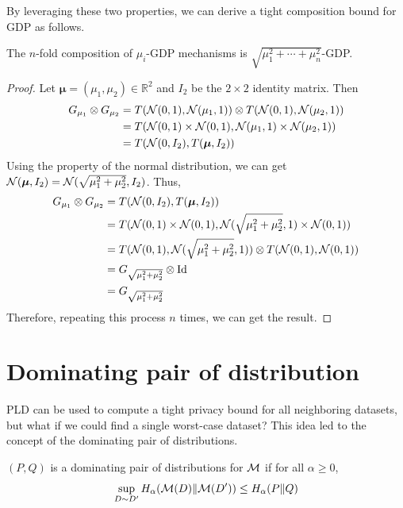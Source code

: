\documentclass{article}
\begin{document}
By leveraging these two properties, we can derive a tight composition bound for GDP as follows.
\begin{theorem}
The $n$-fold composition of $\mu_i$-GDP mechanisms is $\sqrt{\mu_1^2+\cdots+\mu_n^2}$-GDP. 
\begin{proof}
Let $\boldsymbol{\mu} = (\mu_1, \mu_2) \in \mathbb{R}^2$ and $I_2$ be the $2 \times 2$ identity matrix. Then 
\begin{align*}
    G_{\mu_1} \otimes G_{\mu_2} &= T({\mathcal{N}}(0,1), {\mathcal{N}}(\mu_1,1)) \otimes T({\mathcal{N}}(0,1), {\mathcal{N}}(\mu_2,1))\\ 
    &= T({\mathcal{N}}(0,1) \times {\mathcal{N}}(0,1) ,{\mathcal{N}}(\mu_1,1) \times {\mathcal{N}}(\mu_2,1))\\
    &= T({\mathcal{N}}(0,I_2),T(\boldsymbol{\mu},I_2))
\end{align*}
Using the property of the normal distribution, we can get ${\mathcal{N}}(\boldsymbol{\mu},I_2) = {\mathcal{N}}(\sqrt{\mu_1^2+\mu_2^2},I_2)$. Thus,
\begin{align*}
    G_{\mu_1} \otimes G_{\mu_2} &= T({\mathcal{N}}(0,I_2),T(\boldsymbol{\mu},I_2))\\
    & = T({\mathcal{N}}(0,1) \times {\mathcal{N}}(0,1),{\mathcal{N}}(\sqrt{\mu_1^2 + \mu_2^2}, 1) \times {\mathcal{N}}(0,1)) \\
    & = T({\mathcal{N}}(0,1) , {\mathcal{N}}(\sqrt{\mu_1^2 + \mu_2^2}, 1)) \otimes T({\mathcal{N}}(0,1), {\mathcal{N}}(0,1)) \\
    & = G_{\sqrt{\mu_1^2 + \mu_2^2}} \otimes \text{Id}\\
    &= G_{\sqrt{\mu_1^2 + \mu_2^2}}
\end{align*}
Therefore, repeating this process $n$ times, we can get the result.
\end{proof}
\end{theorem}

\section{Dominating pair of distribution}
PLD can be used to compute a tight privacy bound for all neighboring datasets, but what if we could find a single worst-case dataset? This idea led to the concept of the dominating pair of distributions.
\begin{definition}
    $(P,Q)$ is a dominating pair of distributions for ${\mathcal{M}}$ if for all $\alpha \ge 0$,
    \begin{equation*}
        \sup_{D\sim D'} H_\alpha({\mathcal{M}}(D)\Vert{\mathcal{M}}(D')) \le H_\alpha (P\Vert Q)
    \end{equation*}
\end{definition}
\end{document}
